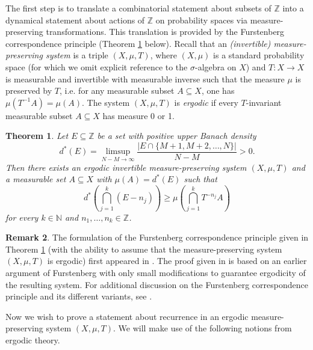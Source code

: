 \documentclass{amsart}
\newtheorem{theorem}{Theorem}[section]
\theoremstyle{definition}
\newtheorem{remark}[theorem]{Remark}
\numberwithin{equation}{section}
\newcommand{\N}{\mathbb{N}}
\newcommand{\Z}{\mathbb{Z}}
\begin{document}
The first step is to translate a combinatorial statement about subsets of $\Z$ into a dynamical statement about actions of $\Z$ on probability spaces via measure-preserving transformations.
This translation is provided by the Furstenberg correspondence principle (Theorem \ref{thm: correspondence} below).
Recall that an \emph{(invertible) measure-preserving system} is a triple $(X, \mu, T)$, where $(X, \mu)$ is a standard probability space (for which we omit explicit reference to the $\sigma$-algebra on $X$) and $T : X \to X$ is measurable and invertible with measurable inverse such that the measure $\mu$ is preserved by $T$, i.e. for any measurable subset $A \subseteq X$, one has $\mu(T^{-1}A) = \mu(A)$.
The system $(X, \mu, T)$ is \emph{ergodic} if every $T$-invariant measurable subset $A \subseteq X$ has measure 0 or 1.

\begin{theorem} \label{thm: correspondence}
    Let $E \subseteq \Z$ be a set with positive upper Banach density
    \begin{equation*}
        d^*(E) = \limsup_{N - M\to \infty} \frac{\left| E \cap \{M+1, M+2, \dots, N\}\right|}{N-M} > 0.
    \end{equation*}
    Then there exists an ergodic invertible measure-preserving system $(X, \mu, T)$ and a measurable set $A \subseteq X$ with $\mu(A) = d^*(E)$ such that
    \begin{equation*}
        d^* \left( \bigcap_{j=1}^k (E - n_j) \right) \ge \mu \left( \bigcap_{j=1}^k T^{-n_j}A \right)
    \end{equation*}
    for every $k \in \N$ and $n_1, \dots, n_k \in \Z$.
\end{theorem}

\begin{remark}
    The formulation of the Furstenberg correspondence principle given in Theorem \ref{thm: correspondence} (with the ability to assume that the measure-preserving system $(X, \mu, T)$ is ergodic) first appeared in \cite[Proposition 3.1]{bhk}.
    The proof given in \cite{bhk} is based on an earlier argument of Furstenberg \cite[Lemma 3.7]{furstenberg_book} with only small modifications to guarantee ergodicity of the resulting system.
    For additional discussion on the Furstenberg correspondence principle and its different variants, see \cite[p. 7]{bf}.
\end{remark}

Now we wish to prove a statement about recurrence in an ergodic measure-preserving system $(X, \mu, T)$.
We will make use of the following notions from ergodic theory.
\end{document}
